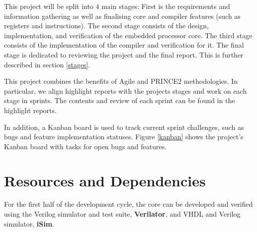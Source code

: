 \documentclass[11pt,a4paper]{report}
\begin{document}
This project will be split into 4 main stages: First is the requirements and information gathering as well as finalising core and compiler features (such as registers and instructions). The second stage consists of the design, implementation, and verification  of the embedded processor core. The third stage consists of the implementation of the compiler and verification for it. The final stage is dedicated to reviewing the project and the final report. This is further described in section \ref{stages}.

This project combines the benefits of Agile and PRINCE2 methodologies. In particular, we align highlight reports with the projects stages and work on each stage in sprints. The contents and review of each sprint can be found in the highlight reports.

In addition, a Kanban board is used to track current sprint challenges, such as bugs and feature implementation statuses. Figure \ref{kanban} shows the project's Kanban board with tasks for open bugs and features.



\section{Resources and Dependencies}
For the first half of the development cycle, the core can be developed and verified using the Verilog simulator and test suite, \textbf{Verilator}, and VHDL and Verilog simulator, \textbf{iSim}.
\end{document}
